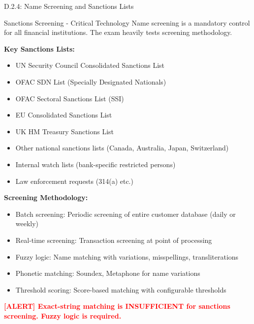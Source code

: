 \documentclass[11pt,a4paper]{beamer}
\newcommand{\redflag}[1]{\textcolor{red}{\textbf{[ALERT] #1}}}
\begin{document}
\begin{frame}{D.2.4: Name Screening and Sanctions Lists}
	\begin{block}{Sanctions Screening - Critical Technology}
		Name screening is a mandatory control for all financial institutions. The exam heavily tests screening methodology.
	\end{block}
	\textbf{Key Sanctions Lists:}
	\begin{itemize}
		\item UN Security Council Consolidated Sanctions List
		\item OFAC SDN List (Specially Designated Nationals)
		\item OFAC Sectoral Sanctions List (SSI)
		\item EU Consolidated Sanctions List
		\item UK HM Treasury Sanctions List
		\item Other national sanctions lists (Canada, Australia, Japan, Switzerland)
		\item Internal watch lists (bank-specific restricted persons)
		\item Law enforcement requests (314(a) etc.)
	\end{itemize}
	\textbf{Screening Methodology:}
	\begin{itemize}
		\item Batch screening: Periodic screening of entire customer database (daily or weekly)
		\item Real-time screening: Transaction screening at point of processing
		\item Fuzzy logic: Name matching with variations, misspellings, transliterations
		\item Phonetic matching: Soundex, Metaphone for name variations
		\item Threshold scoring: Score-based matching with configurable thresholds
	\end{itemize}
	\redflag{Exact-string matching is INSUFFICIENT for sanctions screening. Fuzzy logic is required.}
\end{frame}
\end{document}
